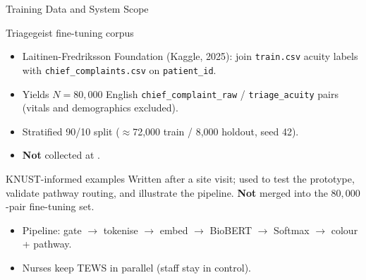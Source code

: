\begin{frame}{Training Data and System Scope}
	\begin{block}{Triagegeist fine-tuning corpus \citep{triagegeist2025}}
		\begin{itemize}
			\item Laitinen-Fredriksson Foundation (Kaggle, 2025): join \texttt{train.csv} acuity labels with \texttt{chief\_complaints.csv} on \texttt{patient\_id}.
			\item Yields \(N=80{,}000\) English \texttt{chief\_complaint\_raw} / \texttt{triage\_acuity} pairs (vitals and demographics excluded).
			\item Stratified 90/10 split (\(\approx\)72{,}000 train / 8{,}000 holdout, seed 42).
			\item \textbf{Not} collected at \examplehospital{}.
		\end{itemize}
	\end{block}
	\begin{block}{KNUST-informed examples}
		Written after a site visit; used to test the prototype, validate pathway routing, and illustrate the pipeline.
		\textbf{Not} merged into the \(80{,}000\)-pair fine-tuning set.
	\end{block}
	\begin{itemize}
		\item Pipeline: gate \(\to\) tokenise \(\to\) embed \(\to\) BioBERT \(\to\) Softmax \(\to\) colour + pathway.
		\item Nurses keep TEWS in parallel (staff stay in control).
	\end{itemize}
\end{frame}
